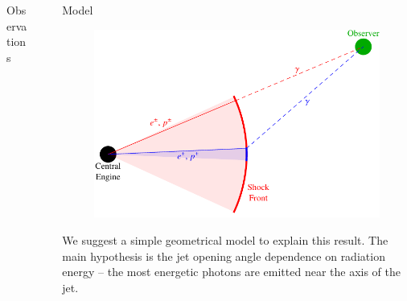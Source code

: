 \documentclass[final]{beamer}
\newlength{\sepwid}
\newlength{\onecolwid}
\newlength{\twocolwid}
\begin{document}
\begin{frame}[t]
\begin{columns}[t]
\begin{column}{\onecolwid}
\begin{block}{Observations}
\end{block}


\end{column} %

\begin{column}{\sepwid}\end{column} %

\begin{column}{\twocolwid} %

\begin{columns}[t,totalwidth=\twocolwid] %

\begin{column}{\onecolwid}\vspace{-.6in} %


\begin{block}{Model}

\begin{figure}
\includegraphics[width=\textwidth]{modelOverview.pdf}
\end{figure}

We suggest a simple geometrical model to explain this result.
The main hypothesis is the jet opening angle dependence on radiation energy -- the most energetic photons are emitted near the axis of the jet.


\end{block}
\end{column}
\end{columns}
\end{column}
\end{columns}
\end{frame}
\end{document}
